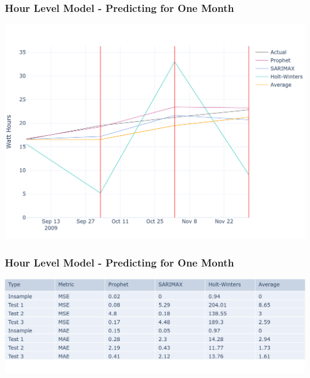 \documentclass[10pt]{beamer}
\begin{document}
\begin{frame}
\frametitle{Hour Level Model - Predicting for One Month}

\bigskip
{
    \centering
    \includegraphics[width=\textwidth,height=\textheight,keepaspectratio]{model_comparison_timeseries_hourmodel_months.png}
    \par
}
\bigskip

\end{frame}

\begin{frame}
\frametitle{Hour Level Model - Predicting for One Month}

\bigskip
{
    \centering
    \includegraphics[width=\textwidth,height=\textheight,keepaspectratio]{model_comparison_table_hourmodel_months.png}
    \par
}
\bigskip

\end{frame}
\end{document}
